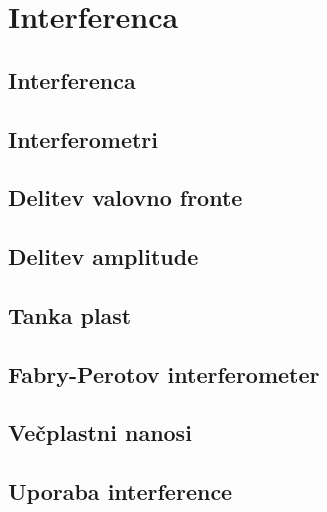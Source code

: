 
\chapter{Interferenca}

\section{Interferenca}
\section{Interferometri}
\section{Delitev valovno fronte}
\section{Delitev amplitude}
\section{Tanka plast}
\section{Fabry-Perotov interferometer}
\section{Večplastni nanosi}
\section{Uporaba interference}
